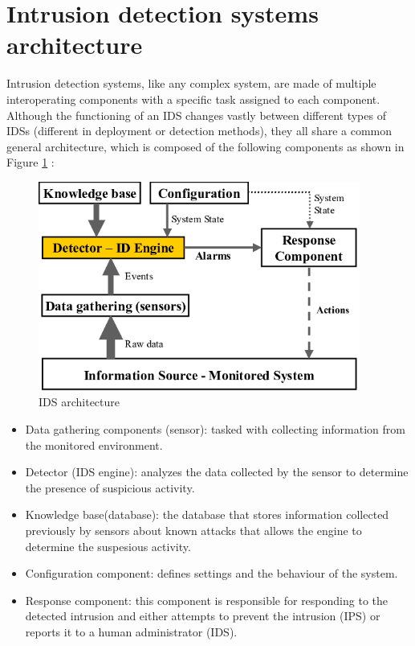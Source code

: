 \section{Intrusion detection systems architecture}
Intrusion detection systems, like any complex system, are made of multiple interoperating components with a specific task assigned to each component. Although the functioning of an IDS changes vastly between different types of IDSs (different in deployment or detection methods), they all share a common general architecture, which is composed of the following components as shown in Figure \ref{fig:arch_IDS} \cite{arch-IDS}:

\begin{figure}[h]
	\centering
	\includegraphics[width=400px]{figures/arch_IDS.png}
	\caption{IDS architecture \cite{arch-IDS}}
	\label{fig:arch_IDS}
\end{figure}

\firmlist
\begin{itemize}
	\item Data gathering components (sensor): tasked with collecting information from the monitored environment.
	\item Detector (IDS engine): analyzes the data collected by the sensor to determine the presence of suspicious activity.
	\item Knowledge base(database): the database that stores information collected previously by sensors about known attacks that allows the engine to determine the suspesious activity.
	\item Configuration component: defines settings and the behaviour of the system.
	\item Response component: this component is responsible for responding to the detected intrusion and either attempts to prevent the intrusion (IPS) or reports it to a human administrator (IDS).
\end{itemize}



